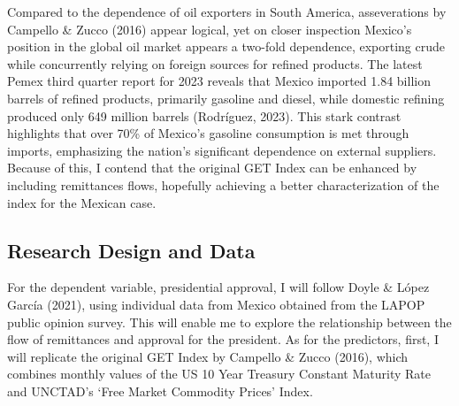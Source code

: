 \documentclass[
]{article}
\begin{document}
Compared to the dependence of oil exporters in South America,
asseverations by Campello \& Zucco (2016) appear logical, yet on closer
inspection Mexico's position in the global oil market appears a two-fold
dependence, exporting crude while concurrently relying on foreign
sources for refined products. The latest Pemex third quarter report for
2023 reveals that Mexico imported 1.84 billion barrels of refined
products, primarily gasoline and diesel, while domestic refining
produced only 649 million barrels (Rodríguez, 2023). This stark contrast
highlights that over 70\% of Mexico's gasoline consumption is met
through imports, emphasizing the nation's significant dependence on
external suppliers. Because of this, I contend that the original GET
Index can be enhanced by including remittances flows, hopefully
achieving a better characterization of the index for the Mexican case.

\hypertarget{research-design-and-data}{%
\subsection{Research Design and Data}\label{research-design-and-data}}

For the dependent variable, presidential approval, I will follow Doyle
\& López García (2021), using individual data from Mexico obtained from
the LAPOP public opinion survey. This will enable me to explore the
relationship between the flow of remittances and approval for the
president. As for the predictors, first, I will replicate the original
GET Index by Campello \& Zucco (2016), which combines monthly values of
the US 10 Year Treasury Constant Maturity Rate and UNCTAD's `Free Market
Commodity Prices' Index.
\end{document}
